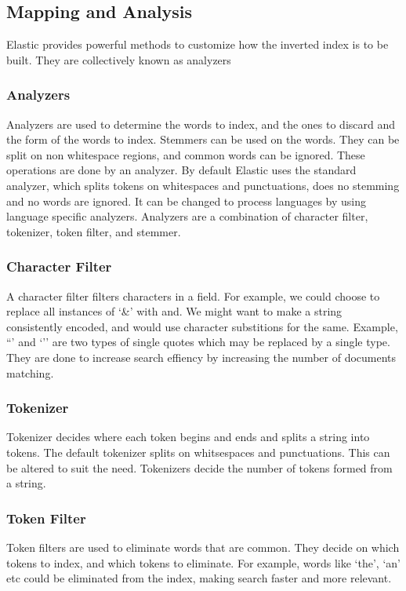 \documentclass[12pt]{article}
\begin{document}
		\subsection{Mapping and Analysis}
			Elastic provides powerful methods to customize how the inverted index is to be built. They are collectively known as analyzers

			\subsubsection{Analyzers}
				Analyzers are used to determine the words to index, and the ones to discard and the form of the words to index. Stemmers can be used on the words. They can be split on non whitespace regions, and common words can be ignored. These operations are done by an analyzer. By default Elastic uses the standard analyzer, which splits tokens on whitespaces and punctuations, does no stemming and no words are ignored. It can be changed to process languages by using language specific analyzers. Analyzers are a combination of character filter, tokenizer, token filter, and stemmer.

			\subsubsection{Character Filter}
				A character filter filters characters in a field. For example, we could choose to replace all instances of `\&' with and. We might want to make a string consistently encoded, and would use character substitions for the same. Example, ``' and `'' are two types of single quotes which may be replaced by a single type. They are done to increase search effiency by increasing the number of documents matching.

			\subsubsection{Tokenizer}
				Tokenizer decides where each token begins and ends and splits a string into tokens. The default tokenizer splits on whitsespaces and punctuations. This can be altered to suit the need. Tokenizers decide the number of tokens formed from a string.

			\subsubsection{Token Filter}
				Token filters are used to eliminate words that are common. They decide on which tokens to index, and which tokens to eliminate. For example, words like `the', `an' etc could be eliminated from the index, making search faster and more relevant. 
\end{document}
